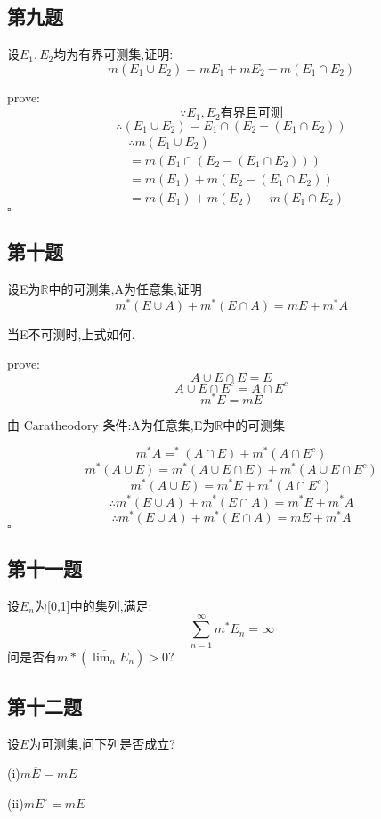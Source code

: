 \documentclass[a4paper]{article}
\begin{document}
    \subsection{第九题}
    设$E_1,E_2$均为有界可测集,证明:
    \[m(E_1\cup E_2)=mE_1+mE_2-m(E_1 \cap E_2)\]

    prove:
    \[\because E_1,E_2 \text{有界且可测}\]
    \[\therefore (E_1 \cup E_2) = E_1 \cap (E_2 - (E_1 \cap E_2))\]
    \begin{align*}
        &\therefore m(E_1 \cup E_2)\\
        & = m(E_1 \cap (E_2 - (E_1 \cap E_2)))\\
        & = m(E_1) + m(E_2 - (E_1 \cap E_2))\\
        & = m(E_1) + m(E_2) - m(E_1 \cap E_2)
    \end{align*}
    \hfill $\square$

    \subsection{第十题}
    设E为$\mathbb{R}$中的可测集,A为任意集,证明
    \[m^{*}(E\cup A)+ m^*(E\cap A)=mE+m^{*}A\]

    当E不可测时,上式如何.

    prove: 
    \[A\cup E \cap E = E\]
    \[A\cup E \cap E^c = A\cap E^c\]
    \[m^*E = mE\]

    由 Caratheodory 条件:A为任意集,E为$\mathbb{R}$中的可测集

    \[m^*A=^*(A\cap E) + m^*(A\cap E^c)\]
    \[m^*(A\cup E)=m^*(A\cup E \cap E) + m^*(A\cup E \cap E^c)\]
    \[m^*(A\cup E)=m^*E+m^*(A\cap E^c)\]
    \[\therefore m^{*}(E\cup A)+ m^*(E\cap A)=m^*E+m^{*}A\]
    \[\therefore m^{*}(E\cup A)+ m^*(E\cap A)=mE+m^{*}A\]
    \hfill $\square$

    \subsection{第十一题}
    设{$E_n$}为[0,1]中的集列,满足:
    \[\sum_{n=1}^{\infty}m^*E_n=\infty\]
    问是否有$m*(\overline{\lim_{n}}E_n)>0$?

    \subsection{第十二题}
    设$E$为可测集,问下列是否成立?

    (i)$m\overline{E}=mE$
    
    (ii)$mE^{\circ}=mE$
\end{document}
